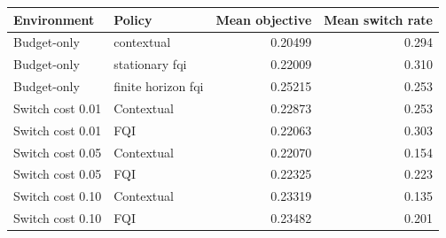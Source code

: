 \begin{tabular}{llrr}
\toprule
Environment & Policy & Mean objective & Mean switch rate \\
\midrule
Budget-only & contextual & 0.20499 & 0.294 \\ 
Budget-only & stationary fqi & 0.22009 & 0.310 \\ 
Budget-only & finite horizon fqi & 0.25215 & 0.253 \\ 
Switch cost 0.01 & Contextual & 0.22873 & 0.253 \\ 
Switch cost 0.01 & FQI & 0.22063 & 0.303 \\ 
Switch cost 0.05 & Contextual & 0.22070 & 0.154 \\ 
Switch cost 0.05 & FQI & 0.22325 & 0.223 \\ 
Switch cost 0.10 & Contextual & 0.23319 & 0.135 \\ 
Switch cost 0.10 & FQI & 0.23482 & 0.201 \\ 
\bottomrule
\end{tabular}
